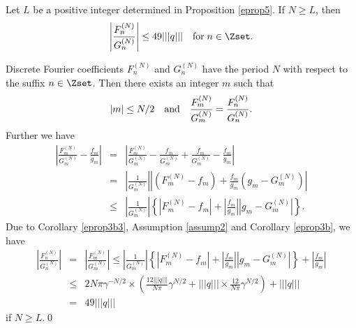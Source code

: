 \begin{prop}
\label{eprop6}
Let $L$ be a positive integer determined in Proposition \ref{eprop5}. If $N \ge L$, then
\begin{displaymath}
\left|\frac{F^{(N)}_n}{G^{(N)}_n}\right| \le 49 |||q||| \quad {\rm for}\; n \in \Zset.
\end{displaymath}
\end{prop}
\begin{pf}
Discrete Fourier coefficients $F^{(N)}_n$ and $G^{(N)}_n$ have the period $N$ with respect to the suffix $n \in \Zset$. Then there exists an integer $m$ such that
\begin{displaymath}
|m| \le N/2 \quad {\rm and} \quad \frac{F^{(N)}_m}{G^{(N)}_m}=\frac{F^{(N)}_n}{G^{(N)}_n}.
\end{displaymath}
Further we have
\begin{eqnarray*}
\left|\frac{F^{(N)}_m}{G^{(N)}_m}-\frac{f_m}{g_m}\right| &=&  \left|\frac{F^{(N)}_m}{G^{(N)}_m}-\frac{f_m}{G^{(N)}_m}+\frac{f_m}{G^{(N)}_m}-\frac{f_m}{g_m}\right|  \\
&=&  \left|\frac{1}{G^{(N)}_m}\right|\left|\left(F^{(N)}_m-f_m\right)+\frac{f_m}{g_m}\left(g_m-G^{(N)}_m\right)\right|  \\
&\le&  \left|\frac{1}{G^{(N)}_m}\right|\left\{\left|F^{(N)}_m-f_m\right|+\left|\frac{f_m}{g_m}\right|\left|g_m-G^{(N)}_m\right|\right\} .
\end{eqnarray*}
Due to Corollary \ref{eprop3b3}, Assumption \ref{assump2} and Corollary \ref{eprop3b}, we have 
\begin{eqnarray*}
\displaystyle\left|\frac{F^{(N)}_n}{G^{(N)}_n}\right| &=& \displaystyle\left|\frac{F^{(N)}_m}{G^{(N)}_m}\right| \le  \displaystyle\left|\frac{1}{G^{(N)}_m}\right|\left\{\left|F^{(N)}_m-f_m\right|+\left|\frac{f_m}{g_m}\right|\left|g_m-G^{(N)}_m\right|\right\}+\left|\frac{f_m}{g_m}\right| \\
&\le& \displaystyle 2N\pi \gamma^{-N/2} \times \left(  \frac{12 |||q|||}{N\pi}\gamma^{N/2} + |||q||| \times \frac{12}{N\pi}\gamma^{N/2} \right) + |||q||| \\
&=& 49 |||q|||
\end{eqnarray*}
if $N \ge L$.\qed
\end{pf}

